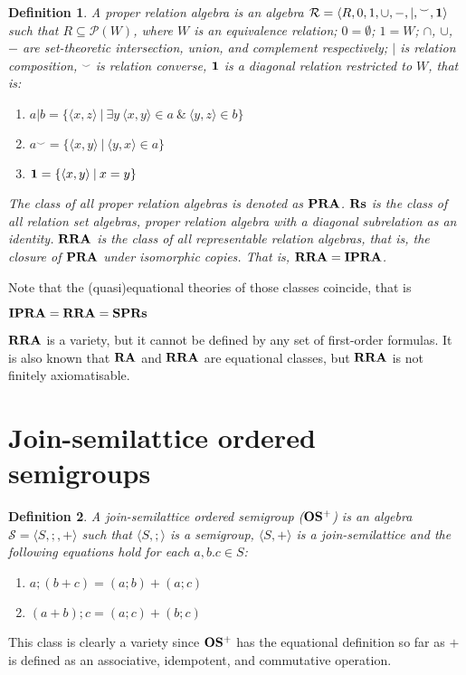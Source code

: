 \documentclass[a4paper]{article}
\theoremstyle{defin}
\newtheorem{defin}{Definition}
\theoremstyle{theorem}
\theoremstyle{prop}
\theoremstyle{lemma}
\theoremstyle{ex}
\theoremstyle{col}
\theoremstyle{claim}
\begin{document}
\begin{defin}
    A proper relation algebra is an algebra $\mathcal{R} = \langle R, 0, 1, \cup, -, |, {}^{\smile}, {\bf 1 }\rangle$ such that $R \subseteq \mathcal{P}(W)$, where $W$ is an equivalence relation; $0 = \emptyset$; $1 = W$; $\cap$, $\cup$, $-$ are set-theoretic intersection, union, and
    complement respectively; $|$ is relation composition, ${}^{\smile}$ is relation converse, ${\bf 1}$ is a
    diagonal relation restricted to $W$, that is:
    \begin{enumerate}
    \item $a | b = \{ \langle x, z \rangle \: | \: \exists y \: \langle x, y \rangle \in a \: \& \: \langle y, z \rangle \in b \}$
    \item $a^{\smile} = \{ \langle x, y \rangle \: | \: \langle y, x \rangle \in a \}$
    \item ${\bf 1} = \{ \langle x, y \rangle \: | \: x = y \}$
    \end{enumerate}
      The class of all proper relation algebras is denoted as ${\bf PRA}$. ${\bf Rs}$ is the class of all relation set algebras, proper relation algebra with a diagonal subrelation as an identity. ${\bf RRA}$ is the class of all representable relation algebras, that is, the closure of ${\bf PRA}$ under isomorphic copies. That is,
      ${\bf RRA} = {\bf IPRA}$.
\end{defin}
Note that the (quasi)equational theories of those classes coincide, that is
\begin{center}
  ${\bf IPRA} = {\bf RRA} = {\bf SP}{\bf Rs}$
\end{center}
${\bf RRA}$ is a variety, but it cannot be defined by any set of first-order formulas. It is also known that ${\bf RA}$ and ${\bf RRA}$ are equational classes, but ${\bf RRA}$ is not finitely axiomatisable.


\section{Join-semilattice ordered semigroups}

\begin{defin} A join-semilattice ordered semigroup (${\bf OS^{+}}$) is an algebra $\mathcal{S} = \langle S, ;, + \rangle$ such that $\langle S, ; \rangle$ is a semigroup, $\langle S, + \rangle$ is a join-semilattice and the following equations hold for each $a, b. c \in S$:

  \begin{enumerate}
    \item $a ; (b + c) = (a ; b) + (a ; c)$
    \item $(a + b) ; c = (a ; c) + (b ; c)$
  \end{enumerate}
\end{defin}
This class is clearly a variety since ${\bf OS^{+}}$ has the equational definition so far as $+$ is defined as an associative, idempotent, and commutative operation.
\end{document}
